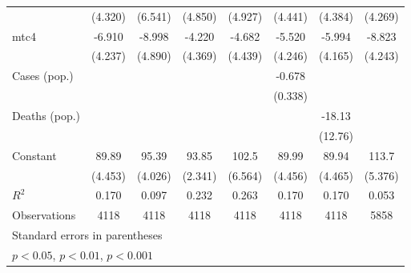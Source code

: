 \documentclass{article}
\begin{document}
{\begin{longtable}{l*{7}{c}}
                &  (4.320)         &  (6.541)         &  (4.850)         &  (4.927)         &  (4.441)         &  (4.384)         &  (4.269)         \\
mtc4            &   -6.910         &   -8.998         &   -4.220         &   -4.682         &   -5.520         &   -5.994         &   -8.823\sym{*}  \\
                &  (4.237)         &  (4.890)         &  (4.369)         &  (4.439)         &  (4.246)         &  (4.165)         &  (4.243)         \\
Cases (pop.)    &                  &                  &                  &                  &   -0.678         &                  &                  \\
                &                  &                  &                  &                  &  (0.338)         &                  &                  \\
Deaths (pop.)   &                  &                  &                  &                  &                  &   -18.13         &                  \\
                &                  &                  &                  &                  &                  &  (12.76)         &                  \\
Constant        &    89.89\sym{***}&    95.39\sym{***}&    93.85\sym{***}&    102.5\sym{***}&    89.99\sym{***}&    89.94\sym{***}&    113.7\sym{***}\\
                &  (4.453)         &  (4.026)         &  (2.341)         &  (6.564)         &  (4.456)         &  (4.465)         &  (5.376)         \\
\hline
\(R^{2}\)       &    0.170         &    0.097         &    0.232         &    0.263         &    0.170         &    0.170         &    0.053         \\
Observations    &     4118         &     4118         &     4118         &     4118         &     4118         &     4118         &     5858         \\
\hline\hline
\multicolumn{8}{l}{\footnotesize Standard errors in parentheses}\\
\multicolumn{8}{l}{\footnotesize \sym{*} \(p<0.05\), \sym{**} \(p<0.01\), \sym{***} \(p<0.001\)}\\
\end{longtable}
}
\end{document}
